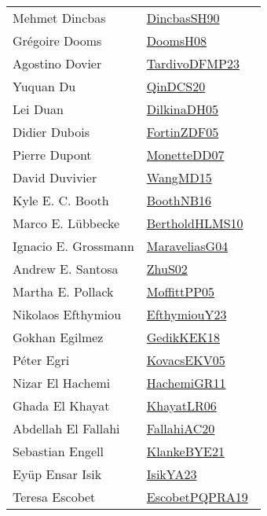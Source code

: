 {\begin{longtable}{p{4cm}p{20cm}}
Mehmet Dincbas & \href{works/DincbasSH90.pdf}{DincbasSH90}~\cite{DincbasSH90}\\
Gr{\'{e}}goire Dooms & \href{works/DoomsH08.pdf}{DoomsH08}~\cite{DoomsH08}\\
Agostino Dovier & \href{works/TardivoDFMP23.pdf}{TardivoDFMP23}~\cite{TardivoDFMP23}\\
Yuquan Du & \href{works/QinDCS20.pdf}{QinDCS20}~\cite{QinDCS20}\\
Lei Duan & \href{works/DilkinaDH05.pdf}{DilkinaDH05}~\cite{DilkinaDH05}\\
Didier Dubois & \href{works/FortinZDF05.pdf}{FortinZDF05}~\cite{FortinZDF05}\\
Pierre Dupont & \href{works/MonetteDD07.pdf}{MonetteDD07}~\cite{MonetteDD07}\\
David Duvivier & \href{works/WangMD15.pdf}{WangMD15}~\cite{WangMD15}\\
Kyle E. C. Booth & \href{works/BoothNB16.pdf}{BoothNB16}~\cite{BoothNB16}\\
Marco E. L{\"{u}}bbecke & \href{works/BertholdHLMS10.pdf}{BertholdHLMS10}~\cite{BertholdHLMS10}\\
Ignacio E. Grossmann & \href{works/MaraveliasG04.pdf}{MaraveliasG04}~\cite{MaraveliasG04}\\
Andrew E. Santosa & \href{works/ZhuS02.pdf}{ZhuS02}~\cite{ZhuS02}\\
Martha E. Pollack & \href{works/MoffittPP05.pdf}{MoffittPP05}~\cite{MoffittPP05}\\
Nikolaos Efthymiou & \href{works/EfthymiouY23.pdf}{EfthymiouY23}~\cite{EfthymiouY23}\\
Gokhan Egilmez & \href{works/GedikKEK18.pdf}{GedikKEK18}~\cite{GedikKEK18}\\
P{\'{e}}ter Egri & \href{works/KovacsEKV05.pdf}{KovacsEKV05}~\cite{KovacsEKV05}\\
Nizar El Hachemi & \href{works/HachemiGR11.pdf}{HachemiGR11}~\cite{HachemiGR11}\\
Ghada El Khayat & \href{works/KhayatLR06.pdf}{KhayatLR06}~\cite{KhayatLR06}\\
Abdellah El Fallahi & \href{works/FallahiAC20.pdf}{FallahiAC20}~\cite{FallahiAC20}\\
Sebastian Engell & \href{works/KlankeBYE21.pdf}{KlankeBYE21}~\cite{KlankeBYE21}\\
Ey{\"{u}}p Ensar Isik & \href{works/IsikYA23.pdf}{IsikYA23}~\cite{IsikYA23}\\
Teresa Escobet & \href{works/EscobetPQPRA19.pdf}{EscobetPQPRA19}~\cite{EscobetPQPRA19}\\

\end{longtable}}
